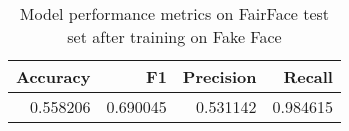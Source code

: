 \begin{table}
\centering
\caption{Model performance metrics on FairFace test set after training on Fake Face}
\label{vgg10-fairface-metrics}
\begin{tabular}{rrrr}
\toprule
 Accuracy &        F1 &  Precision &    Recall \\
\midrule
 0.558206 &  0.690045 &   0.531142 &  0.984615 \\
\bottomrule
\end{tabular}
\end{table}

